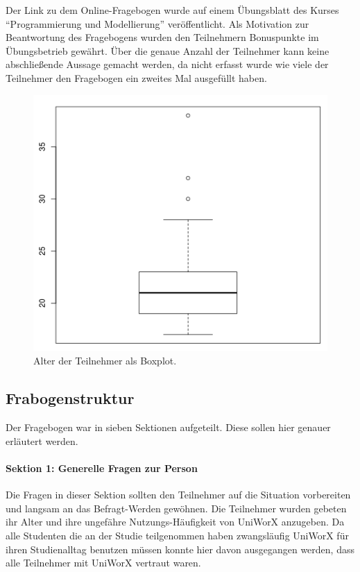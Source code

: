 \documentclass[11pt,a4paper,twoside,ngerman]{article}
\begin{document}
Der Link zu dem Online-Fragebogen wurde auf einem Übungsblatt des Kurses "`Programmierung und Modellierung"' veröffentlicht. Als Motivation zur Beantwortung des Fragebogens wurden den Teilnehmern Bonuspunkte im Übungsbetrieb gewährt.
Über die genaue Anzahl der Teilnehmer kann keine abschließende Aussage gemacht werden, da nicht erfasst wurde wie viele der Teilnehmer den Fragebogen ein zweites Mal ausgefüllt haben.

\begin{figure}
    \centering
    \includegraphics[width=\textwidth]{boxplot_age.png}
    \caption{Alter der Teilnehmer als Boxplot.}
    \label{fig:participants_age_bp}
\end{figure}

\subsection{Frabogenstruktur} \label{sec:study_structure}
Der Fragebogen war in sieben Sektionen aufgeteilt. Diese sollen hier genauer erläutert werden.

\paragraph{Sektion 1: Generelle Fragen zur Person}
Die Fragen in dieser Sektion sollten den Teilnehmer auf die Situation vorbereiten und langsam an das Befragt-Werden gewöhnen. Die Teilnehmer wurden gebeten ihr Alter und ihre ungefähre Nutzungs-Häufigkeit von UniWorX anzugeben. Da alle Studenten die an der Studie teilgenommen haben zwangsläufig UniWorX für ihren Studienalltag benutzen müssen konnte hier davon ausgegangen werden, dass alle Teilnehmer mit UniWorX vertraut waren.
\end{document}
